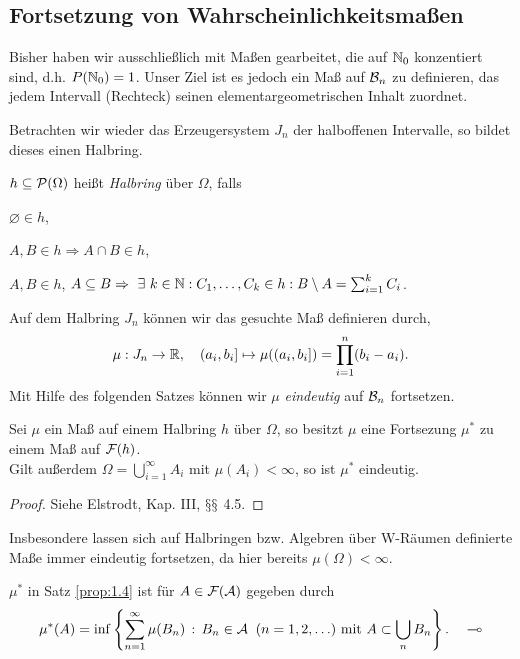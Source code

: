\subsection{Fortsetzung von Wahrscheinlichkeitsmaßen}

Bisher haben wir ausschließlich mit Maßen gearbeitet, die auf $\mathbb{N}_0$
konzentiert sind, d.h. $P(\mathbb{N}_0) = 1$. Unser Ziel ist es jedoch ein Maß auf
$\mathcal{B}_n$ zu definieren, das jedem Intervall (Rechteck) seinen
elementargeometrischen Inhalt zuordnet. 

Betrachten wir wieder das Erzeugersystem $J_n$ der halboffenen Intervalle,
so bildet dieses einen Halbring.
\begin{defnn}
$h\subseteq \mathcal{P}(\Omega)$ heißt \emph{Halbring} über $\Omega$, falls
\begin{defnenum}
  \item $\varnothing\in h$,
  \item $A,B\in h \Rightarrow A\cap B\in h$,
  \item $A,B\in h$, $A\subseteq B \Rightarrow \exists k\in\N: C_1,\ldots,C_k\in
  h : B\setminus A = \sum_{i=1}^k C_i$.\fishhere
\end{defnenum} 
\end{defnn}
Auf dem Halbring $J_n$ können wir das gesuchte Maß definieren durch,
\begin{align*}
\mu: J_n \to\mathbb{R},\quad 
(a_i,b_i] \mapsto \mu((a_i,b_i]) = \prod\limits_{i=1}^n (b_i-a_i).
\end{align*}
Mit Hilfe des folgenden Satzes können wir $\mu$ \textit{eindeutig} auf $\mathcal{B}_n$
fortsetzen.
\begin{prop}
\label{prop:1.4}
Sei $\mu$ ein Maß auf einem Halbring $h$ über $\Omega$, so besitzt
$\mu$ eine Fortsezung $\mu^*$ zu einem Maß auf $\mathcal{F}(h)$.
\\
Gilt außerdem $\Omega = \bigcup_{i=1}^\infty A_i$ mit $\mu(A_i)<\infty$, so ist
$\mu^*$ eindeutig.\fishhere
\end{prop}
\begin{proof}
Siehe Elstrodt, Kap. III, $\mathsection\mathsection$ 4.5.\qedhere
\end{proof}

Insbesondere lassen sich auf Halbringen bzw. Algebren über W-Räumen definierte
Maße immer eindeutig fortsetzen, da hier bereits $\mu(\Omega)<\infty$.

\begin{bem}
\label{bem:1.3}
$\mu^*$ in Satz \ref{prop:1.4} ist für $A\in\mathcal{F}(\mathcal{A})$ gegeben durch
\begin{align*}
\mu^*(A) = \inf \left\{  \sum\limits^{\infty }_{n=1} \mu(B_{n})\,:\,B_{n} \in
\mathcal{A} \; \; (n=1,2,\ldots ) \mbox{ mit } A \subset \bigcup\limits_{n}
B_{n}\right\}.\quad\multimap
\end{align*}
\end{bem}

